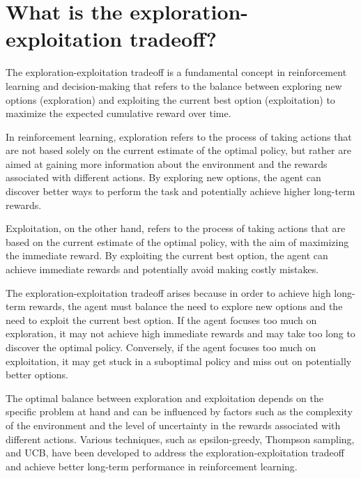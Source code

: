 \section{What is the exploration-exploitation tradeoff?}
The exploration-exploitation tradeoff is a fundamental concept in reinforcement learning and decision-making that refers to the balance between exploring new options (exploration) and exploiting the current best option (exploitation) to maximize the expected cumulative reward over time.

In reinforcement learning, exploration refers to the process of taking actions that are not based solely on the current estimate of the optimal policy, but rather are aimed at gaining more information about the environment and the rewards associated with different actions. By exploring new options, the agent can discover better ways to perform the task and potentially achieve higher long-term rewards.

Exploitation, on the other hand, refers to the process of taking actions that are based on the current estimate of the optimal policy, with the aim of maximizing the immediate reward. By exploiting the current best option, the agent can achieve immediate rewards and potentially avoid making costly mistakes.

The exploration-exploitation tradeoff arises because in order to achieve high long-term rewards, the agent must balance the need to explore new options and the need to exploit the current best option. If the agent focuses too much on exploration, it may not achieve high immediate rewards and may take too long to discover the optimal policy. Conversely, if the agent focuses too much on exploitation, it may get stuck in a suboptimal policy and miss out on potentially better options.

The optimal balance between exploration and exploitation depends on the specific problem at hand and can be influenced by factors such as the complexity of the environment and the level of uncertainty in the rewards associated with different actions. Various techniques, such as epsilon-greedy, Thompson sampling, and UCB, have been developed to address the exploration-exploitation tradeoff and achieve better long-term performance in reinforcement learning.

